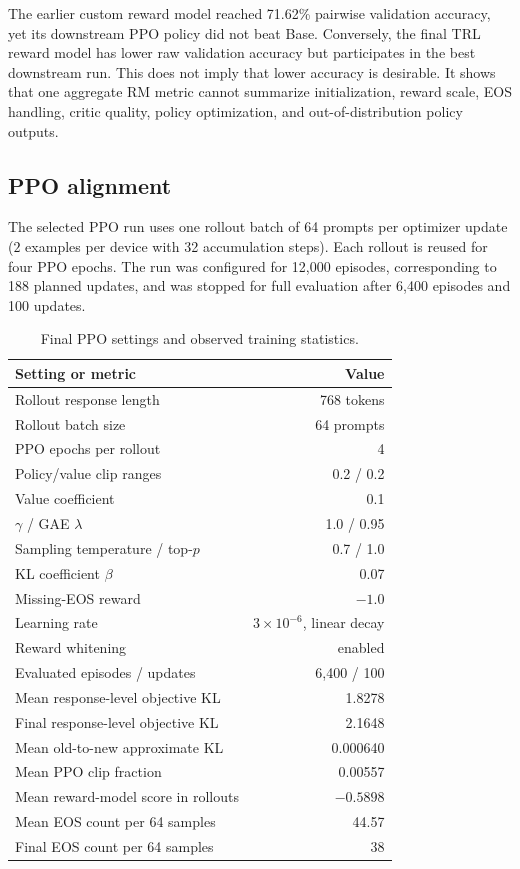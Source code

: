 \documentclass[11pt]{article}
\newcommand{\trl}{\textsc{TRL}}
\begin{document}
The earlier custom reward model reached 71.62\% pairwise validation accuracy,
yet its downstream PPO policy did not beat Base. Conversely, the final
\trl{} reward model has lower raw validation accuracy but participates in the
best downstream run. This does not imply that lower accuracy is desirable. It
shows that one aggregate RM metric cannot summarize initialization, reward
scale, EOS handling, critic quality, policy optimization, and
out-of-distribution policy outputs.

\subsection{PPO alignment}

The selected PPO run uses one rollout batch of 64 prompts per optimizer update
($2$ examples per device with 32 accumulation steps). Each rollout is reused
for four PPO epochs. The run was configured for 12,000 episodes, corresponding
to 188 planned updates, and was stopped for full evaluation after 6,400
episodes and 100 updates.

\begin{table}[H]
\centering
\caption{Final PPO settings and observed training statistics.}
\label{tab:ppo}
\begin{tabularx}{0.9\textwidth}{@{}Y r@{}}
\toprule
\textbf{Setting or metric} & \textbf{Value}\\
\midrule
Rollout response length & 768 tokens\\
Rollout batch size & 64 prompts\\
PPO epochs per rollout & 4\\
Policy/value clip ranges & 0.2 / 0.2\\
Value coefficient & 0.1\\
$\gamma$ / GAE $\lambda$ & 1.0 / 0.95\\
Sampling temperature / top-$p$ & 0.7 / 1.0\\
KL coefficient $\beta$ & 0.07\\
Missing-EOS reward & $-1.0$\\
Learning rate & $3\times 10^{-6}$, linear decay\\
Reward whitening & enabled\\
Evaluated episodes / updates & 6,400 / 100\\
Mean response-level objective KL & 1.8278\\
Final response-level objective KL & 2.1648\\
Mean old-to-new approximate KL & 0.000640\\
Mean PPO clip fraction & 0.00557\\
Mean reward-model score in rollouts & $-0.5898$\\
Mean EOS count per 64 samples & 44.57\\
Final EOS count per 64 samples & 38\\
\bottomrule
\end{tabularx}
\end{table}
\end{document}
